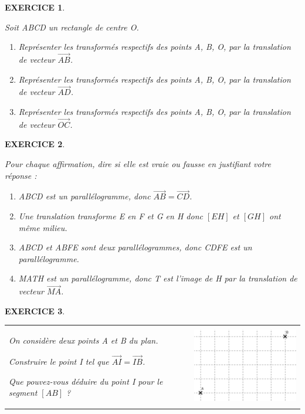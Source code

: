 \documentclass[a4paper]{article}   %
\renewcommand{\(}{\left(}
\renewcommand{\)}{\right)}
\newtheorem{EXO}{\large EXERCICE }
\newenvironment{EX}   { \setcounter{ques}{0} \begin{EXO} \hrulefill ~\vspace{0.3cm}

\normalfont}    {\end{EXO} \medskip}
\def\v{\overrightarrow}	%
\begin{document}
\begin{EX} 
Soit ABCD un rectangle de centre O.
\begin{enumerate}
\item  Représenter les transformés respectifs des points A, B, O, par la translation de vecteur $\v{AB}$.
\item Représenter les transformés respectifs des points A, B, O, par la translation de vecteur $\v{AD}$.
\item Représenter les transformés respectifs des points A, B, O, par la translation de vecteur $\v{OC}$.
\end{enumerate}
\end{EX}

\begin{EX} 
Pour chaque affirmation, dire si elle est vraie ou fausse en justifiant votre réponse :
\begin{enumerate}
\item  ABCD est un parallélogramme, donc $\v{AB}=\v{CD}$.
\item Une translation transforme E en F et G en H donc $[EH]$ et $[GH]$ ont même milieu.
\item ABCD et ABFE sont deux parallélogrammes, donc CDFE est un parallélogramme.
\item MATH est un parallélogramme, donc T est l'image de  H par la translation de vecteur $\v{MA}$.
\end{enumerate}
\end{EX}

\begin{EX} 

\vspace{0.3cm}

\renewcommand{\tabularxcolumn}[1]{b{#1}}
\begin{tabularx}{\linewidth}{Xc}	
On considère deux points A et B du plan. 

\vspace{0.3cm}

Construire le point I tel que $\v{AI}=\v{IB}$. 

\vspace{0.3cm}

Que pouvez-vous déduire du point I pour le segment $[AB]$ ?

&
\includegraphics[width=6cm]{8ex9.png} \\
\end{tabularx}

\end{EX}
\end{document}
